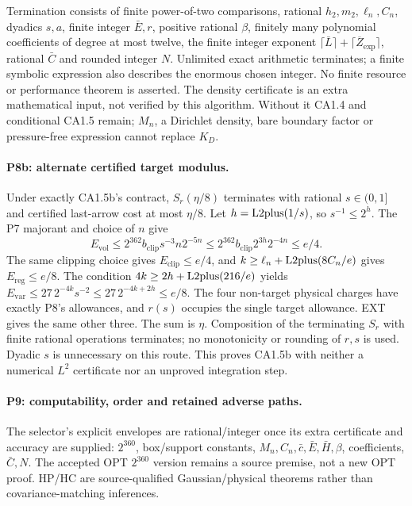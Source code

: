 Termination consists of finite power-of-two comparisons, rational
$h_2,m_2,\ell_n,C_n$, dyadics $s,a$, finite integer $\bar E,r$, positive
rational $\beta$, finitely many polynomial coefficients of degree at most
twelve, the finite integer exponent $\lceil\bar L\rceil+
\lceil\overline Z_{\exp}\rceil$, rational $\bar C$ and rounded integer $N$.
Unlimited exact arithmetic terminates; a finite symbolic expression
also describes the enormous chosen integer. No finite resource or
performance theorem is asserted. The density certificate is an extra
mathematical input, not verified by this algorithm. Without it CA1.4
and conditional CA1.5 remain; $M_n$, a Dirichlet density, bare boundary
factor or pressure-free expression cannot replace $K_D$.

\paragraph{P8b: alternate certified target modulus.}
Under exactly CA1.5b's contract, $S_r(\eta/8)$ terminates with rational
$s\in(0,1]$ and certified last-arrow cost at most $\eta/8$.
Let $h=\operatorname{L2plus}(1/s)$, so $s^{-1}\le2^h$. The P7 majorant and choice of
$n$ give
\[
 E_{\mathrm{vol}}\le2^{362}b_{\mathrm{clip}}s^{-3}n2^{-5n}
 \le2^{362}b_{\mathrm{clip}}2^{3h}2^{-4n}\le e/4 .
\]
The same clipping choice gives $E_{\mathrm{clip}}\le e/4$, and
$k\ge\ell_n+\operatorname{L2plus}(8C_n/e)$ gives $E_{\mathrm{reg}}\le e/8$.
The condition $4k\ge2h+\operatorname{L2plus}(216/e)$ yields
$E_{\mathrm{var}}\le27\,2^{-4k}s^{-2}\le27\,2^{-4k+2h}\le e/8$.
The four non-target physical charges have exactly P8's allowances,
and $r(s)$ occupies the single target allowance. EXT gives the same
other three. The sum is $\eta$. Composition of the terminating $S_r$
with finite rational operations terminates; no monotonicity or rounding
of $r,s$ is used. Dyadic $s$ is unnecessary on this route. This proves
CA1.5b with neither a numerical $L^2$ certificate nor an unproved
integration step.

\paragraph{P9: computability, order and retained adverse paths.}
The selector's explicit envelopes are rational/integer once its extra
certificate and accuracy are supplied: $2^{360}$, box/support constants,
$M_n,C_n,\bar c,\bar E,\bar H,\beta$, coefficients, $\bar C,N$.
The accepted OPT $2^{360}$ version remains a source premise, not a new
OPT proof. HP/HC are source-qualified Gaussian/physical theorems rather
than covariance-matching inferences.


